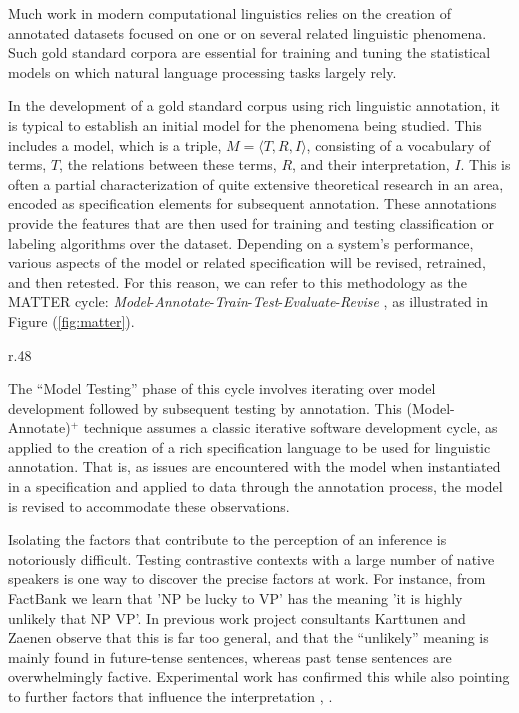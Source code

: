 \documentclass[10pt]{article}
\begin{document}
Much work in modern computational linguistics relies on the creation of annotated datasets focused on one or on several related linguistic phenomena. Such gold standard corpora are essential for training and tuning the statistical models on which natural language processing tasks largely rely.

In the development of a gold standard corpus using rich linguistic annotation, it is typical to establish an initial model for the phenomena being studied. This includes a model, which is a triple, $M = \langle T,R,I \rangle$, consisting of a vocabulary of terms, $T$, the relations between these terms, $R$, and their interpretation,
$I$. This is often a partial characterization of quite extensive theoretical research in an area, encoded as specification elements for subsequent annotation. These annotations provide the features that are then used for training and testing classification or labeling algorithms over the dataset. Depending on a system's performance, various aspects of the model or related specification will be revised, retrained, and then retested. 
For this reason, we can refer to this methodology as the MATTER cycle: {\it Model}-{\it Annotate}-{\it Train}-{\it Test}-{\it Evaluate}-{\it Revise} \cite{pustejovsky2012natural}, as illustrated in Figure (\ref{fig:matter}). 

\begin{wrapfigure}{r}{.48\textwidth}
\vspace {-9mm}

\centering
{}
\vspace {-4mm}
\caption{The \textsc{matter} Methodology}
\label{fig:matter}

\vspace {-2mm}

\end{wrapfigure}

The ``Model Testing'' phase of this cycle involves iterating over model development followed by subsequent testing by annotation. This (Model-Annotate)$^+$ technique assumes a classic iterative software development cycle, as applied to the creation of a rich specification language to be used for linguistic annotation.  That is, as issues are encountered with the model when instantiated in a specification and applied to data through the annotation process, the model is revised to accommodate these observations. 


Isolating the factors that contribute to the perception of an inference is  notoriously difficult. Testing contrastive contexts with a large number of native speakers is one way to discover the precise factors at work.
For instance, from FactBank we learn that 'NP be lucky to VP' has the meaning 'it is highly unlikely that NP VP'. In previous work project consultants Karttunen and Zaenen \cite{karttunen:2012b,zaenen+karttunen:2013} observe that this is far too general, and that the ``unlikely'' meaning is mainly found in future-tense sentences, whereas past tense sentences are overwhelmingly factive. Experimental work has confirmed this while also pointing to further factors that influence the interpretation \cite{Peters et al}, \cite{karttunen2014}.
\end{document}
